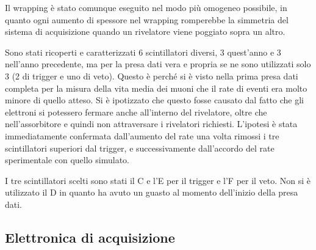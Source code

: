 Il wrapping è stato comunque eseguito nel modo più omogeneo possibile, in quanto ogni aumento di spessore nel wrapping romperebbe la simmetria del sistema di acquisizione quando un rivelatore viene poggiato sopra un altro.

Sono stati ricoperti e caratterizzati 6 scintillatori diversi, 3 quest'anno e 3 nell'anno precedente, ma per la presa dati vera e propria se ne sono utilizzati solo 3 (2 di trigger e uno di veto). Questo \`e perch\'e si \`e visto nella prima presa dati completa per la misura della vita media dei muoni che il rate di eventi era molto minore di quello atteso. Si \`e ipotizzato che questo fosse causato dal fatto che gli elettroni si potessero fermare anche all'interno del rivelatore, oltre che nell'assorbitore e quindi non attraversare i  rivelatori richiesti. L'ipotesi \`e stata immediatamente confermata dall'aumento del rate una volta rimossi i tre scintillatori superiori dal trigger, e successivamente dall'accordo del rate sperimentale con quello simulato.

I tre scintillatori scelti sono stati il C e l'E per il trigger e l'F per il veto. Non si \`e utilizzato il D in quanto ha avuto un guasto al momento dell'inizio della presa dati.

\subsection{Elettronica di acquisizione}

